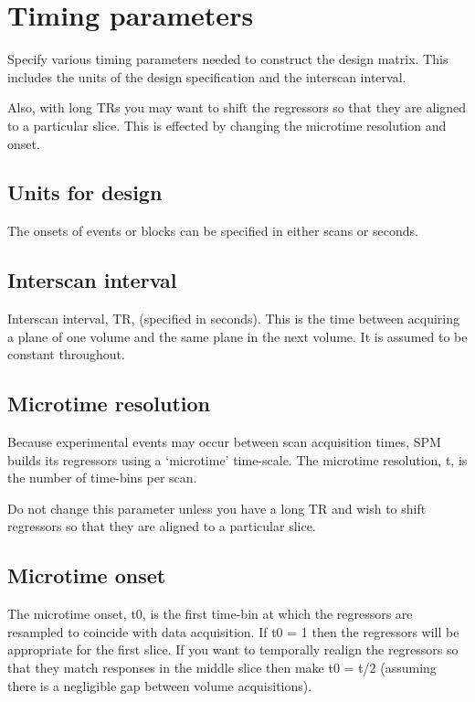 \documentclass[a4paper,titlepage]{book}
\begin{document}
\section{Timing parameters}
Specify various timing parameters needed to construct the design matrix. This includes the units of the design specification and the interscan interval.

                                                                                                            

Also, with long TRs you may want to shift the regressors so that they are aligned to a particular slice.  This is effected by changing the microtime resolution and onset. 


\subsection{Units for design}
The onsets of events or blocks can be specified in either scans or seconds.


\subsection{Interscan interval}
Interscan interval, TR, (specified in seconds).  This is the time between acquiring a plane of one volume and the same plane in the next volume.  It is assumed to be constant throughout.


\subsection{Microtime resolution}

Because experimental events may occur
between scan acquisition times, SPM builds its 
regressors using a `microtime' time-scale. The microtime resolution, t, is the number of time-bins per scan. 

                                                                                                            

Do not change this parameter unless you have a long TR and wish to shift regressors so that they are aligned to a particular slice. 


\subsection{Microtime onset}
The microtime onset, t0, is the first time-bin at which the regressors are resampled to coincide with data acquisition.  If t0 = 1 then the regressors will be appropriate for the first slice.  If you want to temporally realign the regressors so that they match responses in the middle slice then make t0 = t/2 (assuming there is a negligible gap between volume acquisitions). 
\end{document}
